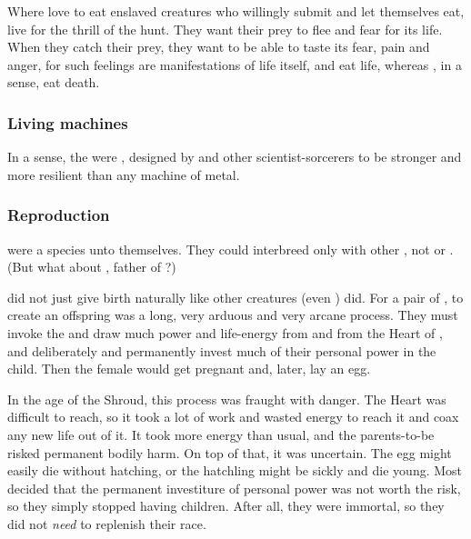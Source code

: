 Where \resphain{} love to eat enslaved creatures who willingly submit and let themselves eat, \dragons{} live for the thrill of the hunt. They want their prey to flee and fear for its life. When they catch their prey, they want to be able to taste its fear, pain and anger, for such feelings are manifestations of life itself, and \dragons{} eat life, whereas \resphain, in a sense, eat death. 





\subsubsection{Living machines}
In a sense, the \dragons were , designed by \Sethicus and other \ophidian scientist-sorcerers to be stronger and more resilient than any machine of metal. 





\subsubsection{Reproduction}
\Dragons were a species unto themselves. 
They could interbreed only with other \dragons, not \quiljaaran or \ophidians.
(But what about \Iurzmacul, father of \Ishnaruchaefir?)

\Dragons did not just give birth naturally like other creatures (even \resphain) did. 
For a pair of \dragons, to create an offspring was a long, very arduous and very arcane process. 
They must invoke the \xss and draw much power and life-energy from \KhothSell and from the Heart of \Miith, and deliberately and permanently invest much of their personal power in the child. 
Then the female would get pregnant and, later, lay an egg. 

In the age of the Shroud, this process was fraught with danger. 
The Heart was difficult to reach, so it took a lot of work and wasted energy to reach it and coax any new life out of it. 
It took more energy than usual, and the \draconic parents-to-be risked permanent bodily harm.
On top of that, it was uncertain. 
The egg might easily die without hatching, or the hatchling might be sickly and die young.
Most \dragons decided that the permanent investiture of personal power was not worth the risk, so they simply stopped having children.
After all, they were immortal, so they did not \emph{need} to replenish their race. 

